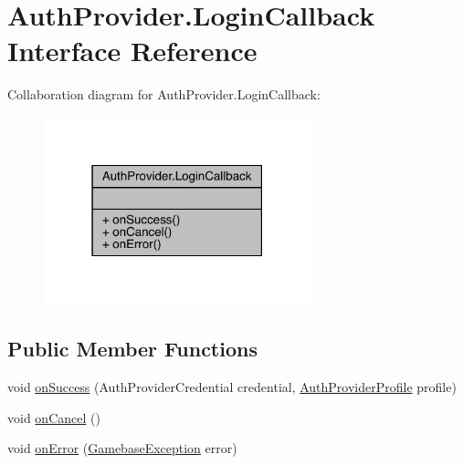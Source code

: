 \hypertarget{interfacecom_1_1toast_1_1android_1_1gamebase_1_1base_1_1auth_1_1_auth_provider_1_1_login_callback}{}\section{Auth\+Provider.\+Login\+Callback Interface Reference}
\label{interfacecom_1_1toast_1_1android_1_1gamebase_1_1base_1_1auth_1_1_auth_provider_1_1_login_callback}


Collaboration diagram for Auth\+Provider.\+Login\+Callback\+:
\nopagebreak
\begin{figure}[H]
\begin{center}
\leavevmode
\includegraphics[width=219pt]{interfacecom_1_1toast_1_1android_1_1gamebase_1_1base_1_1auth_1_1_auth_provider_1_1_login_callback__coll__graph}
\end{center}
\end{figure}
\subsection*{Public Member Functions}
\begin{DoxyCompactItemize}
\item 
void \hyperlink{interfacecom_1_1toast_1_1android_1_1gamebase_1_1base_1_1auth_1_1_auth_provider_1_1_login_callback_abac10bc0cf6029386c43e665067e8fe3}{on\+Success} (Auth\+Provider\+Credential credential, \hyperlink{classcom_1_1toast_1_1android_1_1gamebase_1_1base_1_1auth_1_1_auth_provider_profile}{Auth\+Provider\+Profile} profile)
\item 
void \hyperlink{interfacecom_1_1toast_1_1android_1_1gamebase_1_1base_1_1auth_1_1_auth_provider_1_1_login_callback_a5a5a8c7638e17aa6d75298875b91a597}{on\+Cancel} ()
\item 
void \hyperlink{interfacecom_1_1toast_1_1android_1_1gamebase_1_1base_1_1auth_1_1_auth_provider_1_1_login_callback_aa7fdd9a38f0067a729ab73deef9c9003}{on\+Error} (\hyperlink{classcom_1_1toast_1_1android_1_1gamebase_1_1base_1_1_gamebase_exception}{Gamebase\+Exception} error)
\end{DoxyCompactItemize}


